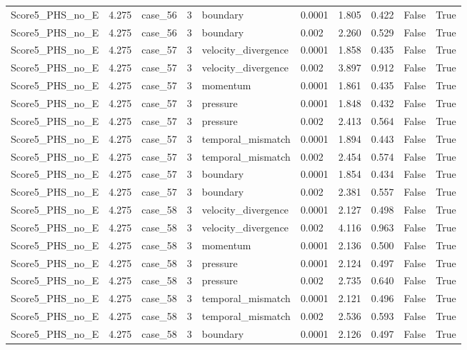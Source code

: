 \begin{longtable}{llllllllll}
Score5\_PHS\_no\_E & 4.275 & case\_56 & 3 & boundary & 0.0001 & 1.805 & 0.422 & False & True \\
Score5\_PHS\_no\_E & 4.275 & case\_56 & 3 & boundary & 0.002 & 2.260 & 0.529 & False & True \\
Score5\_PHS\_no\_E & 4.275 & case\_57 & 3 & velocity\_divergence & 0.0001 & 1.858 & 0.435 & False & True \\
Score5\_PHS\_no\_E & 4.275 & case\_57 & 3 & velocity\_divergence & 0.002 & 3.897 & 0.912 & False & True \\
Score5\_PHS\_no\_E & 4.275 & case\_57 & 3 & momentum & 0.0001 & 1.861 & 0.435 & False & True \\
Score5\_PHS\_no\_E & 4.275 & case\_57 & 3 & pressure & 0.0001 & 1.848 & 0.432 & False & True \\
Score5\_PHS\_no\_E & 4.275 & case\_57 & 3 & pressure & 0.002 & 2.413 & 0.564 & False & True \\
Score5\_PHS\_no\_E & 4.275 & case\_57 & 3 & temporal\_mismatch & 0.0001 & 1.894 & 0.443 & False & True \\
Score5\_PHS\_no\_E & 4.275 & case\_57 & 3 & temporal\_mismatch & 0.002 & 2.454 & 0.574 & False & True \\
Score5\_PHS\_no\_E & 4.275 & case\_57 & 3 & boundary & 0.0001 & 1.854 & 0.434 & False & True \\
Score5\_PHS\_no\_E & 4.275 & case\_57 & 3 & boundary & 0.002 & 2.381 & 0.557 & False & True \\
Score5\_PHS\_no\_E & 4.275 & case\_58 & 3 & velocity\_divergence & 0.0001 & 2.127 & 0.498 & False & True \\
Score5\_PHS\_no\_E & 4.275 & case\_58 & 3 & velocity\_divergence & 0.002 & 4.116 & 0.963 & False & True \\
Score5\_PHS\_no\_E & 4.275 & case\_58 & 3 & momentum & 0.0001 & 2.136 & 0.500 & False & True \\
Score5\_PHS\_no\_E & 4.275 & case\_58 & 3 & pressure & 0.0001 & 2.124 & 0.497 & False & True \\
Score5\_PHS\_no\_E & 4.275 & case\_58 & 3 & pressure & 0.002 & 2.735 & 0.640 & False & True \\
Score5\_PHS\_no\_E & 4.275 & case\_58 & 3 & temporal\_mismatch & 0.0001 & 2.121 & 0.496 & False & True \\
Score5\_PHS\_no\_E & 4.275 & case\_58 & 3 & temporal\_mismatch & 0.002 & 2.536 & 0.593 & False & True \\
Score5\_PHS\_no\_E & 4.275 & case\_58 & 3 & boundary & 0.0001 & 2.126 & 0.497 & False & True \\

\end{longtable}
